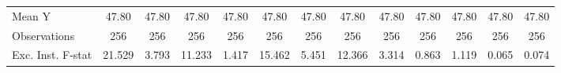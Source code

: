 {\begin{tabular}{l*{12}{c}}
\midrule
Mean Y      &       47.80         &       47.80         &       47.80         &       47.80         &       47.80         &       47.80         &       47.80         &       47.80         &       47.80         &       47.80         &       47.80         &       47.80         \\
Observations&         256         &         256         &         256         &         256         &         256         &         256         &         256         &         256         &         256         &         256         &         256         &         256         \\
Exc. Inst. F-stat&      21.529         &       3.793         &      11.233         &       1.417         &      15.462         &       5.451         &      12.366         &       3.314         &       0.863         &       1.119         &       0.065         &       0.074         \\
\bottomrule
\end{tabular}
}
